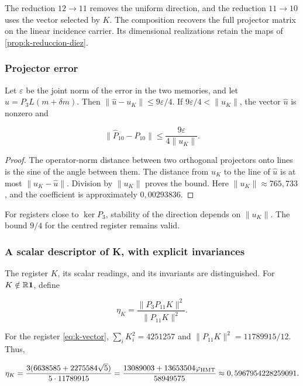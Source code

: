 The reduction \(12\to11\) removes the uniform direction, and the reduction \(11\to10\) uses the vector selected by \(K\). The composition recovers the full projector matrix on the linear incidence carrier. Its dimensional realizations retain the maps of \cref{prop:k-reduccion-diez}.

\subsubsection{Projector error}

Let \(\varepsilon\) be the joint norm of the error in the two memories, and let \(\widehat u=P_3L(m+\delta m)\). Then \(\|\widehat u-u_K\|\le9\varepsilon/4\). If \(9\varepsilon/4<\|u_K\|\), the vector \(\widehat u\) is nonzero and

\begin{equation}
\boxed{
\|\widehat P_{10}-P_{10}\|
\le\frac{9\varepsilon}{4\|u_K\|}.
}
\label{nuc11:eq:15}
\end{equation}

\begin{proof}
The operator-norm distance between two orthogonal projectors onto lines is the sine of the angle between them. The distance from \(u_K\) to the line of \(\widehat u\) is at most \(\|u_K-\widehat u\|\). Division by \(\|u_K\|\) proves the bound. Here \(\|u_K\|\approx765{,}733\), and the coefficient is approximately \(0{,}00293836\).
\end{proof}
For registers close to \(\ker P_3\), stability of the direction depends on \(\|u_K\|\). The bound \(9/4\) for the centred register remains valid.

\subsubsection{A scalar descriptor of K, with explicit invariances}

The register \(K\), its scalar readings, and its invariants are distinguished. For \(K\notin\mathbb R\mathbf1\), define

\begin{equation}
\eta_K=\frac{\|P_3P_{11}K\|^2}{\|P_{11}K\|^2}.
\label{nuc11:eq:16}
\end{equation}

For the register \eqref{eq:k-vector}, \(\sum_iK_i^2=4251257\) and \(\|P_{11}K\|^2=11789915/12\). Thus,

\begin{equation}
\eta_K=
\frac{3(6638585+2275584\sqrt5)}{5\cdot11789915}
=\frac{13089003+13653504\varphi_{\rm HMT}}{58949575}
\approx0,5967954228259091.
\label{nuc11:eq:17}
\end{equation}

